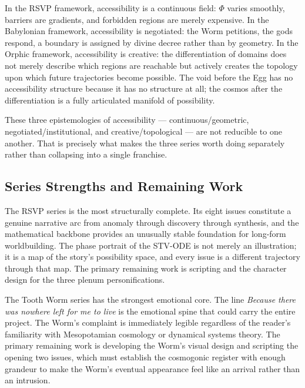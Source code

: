 \documentclass[12pt, a4paper]{article}
\begin{document}
In the RSVP framework, accessibility is a continuous field: $\Phi$ varies smoothly, barriers are gradients, and forbidden regions are merely expensive. In the Babylonian framework, accessibility is negotiated: the Worm petitions, the gods respond, a boundary is assigned by divine decree rather than by geometry. In the Orphic framework, accessibility is creative: the differentiation of domains does not merely describe which regions are reachable but actively creates the topology upon which future trajectories become possible. The void before the Egg has no accessibility structure because it has no structure at all; the cosmos after the differentiation is a fully articulated manifold of possibility.

These three epistemologies of accessibility --- continuous/geometric, negotiated/institutional, and creative/topological --- are not reducible to one another. That is precisely what makes the three series worth doing separately rather than collapsing into a single franchise.

\subsection{Series Strengths and Remaining Work}

The RSVP series is the most structurally complete. Its eight issues constitute a genuine narrative arc from anomaly through discovery through synthesis, and the mathematical backbone provides an unusually stable foundation for long-form worldbuilding. The phase portrait of the STV-ODE is not merely an illustration; it is a map of the story's possibility space, and every issue is a different trajectory through that map. The primary remaining work is scripting and the character design for the three plenum personifications.

The Tooth Worm series has the strongest emotional core. The line \textit{Because there was nowhere left for me to live} is the emotional spine that could carry the entire project. The Worm's complaint is immediately legible regardless of the reader's familiarity with Mesopotamian cosmology or dynamical systems theory. The primary remaining work is developing the Worm's visual design and scripting the opening two issues, which must establish the cosmogonic register with enough grandeur to make the Worm's eventual appearance feel like an arrival rather than an intrusion.
\end{document}
